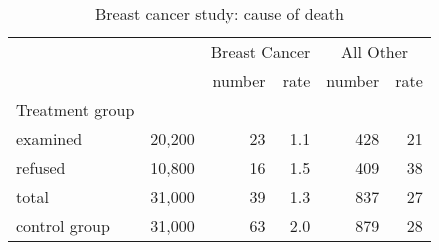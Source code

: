 \documentclass[landscape]{exam}
\begin{document}
  \begin{table}
    \centering
    \begin{tabular}{lrrrrr}
      & & \multicolumn{2}{c}{Breast Cancer} & \multicolumn{2}{c}{All Other} \\
                               \cmidrule(r){3-4} \cmidrule(r){5-6}    
                      &        & number & rate & number & rate \\
      Treatment group \\
      examined        & 20,200 & 23     & 1.1  & 428    & 21 \\
      refused         & 10,800 & 16     & 1.5  & 409    & 38 \\
      total           & 31,000 & 39     & 1.3  & 837    & 27 \\
    \midrule
      control group   & 31,000 & 63     & 2.0  & 879    & 28 \\
    \end{tabular}
    \caption{Breast cancer study: cause of death}
    \label{tab:breast.cancer}
  \end{table}
\end{document}
